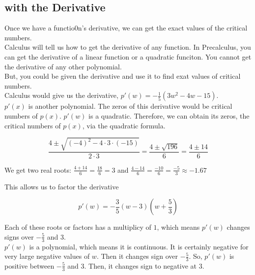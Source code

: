 \documentclass{ximera}
\begin{document}
\subsection*{with the Derivative}


Once we have a functio0n's derivative, we can get the exact values of the critical numbers. \\


Calculus will tell us how to get the derivative of any function.  In Precalculus, you can get the derivative of a linear function or a quadratic funciton.  You cannot get the derivative of any other polynomial.\\

But, you could be given the derivative and use it to find exat values of critical numbers. \\




Calculus would give us the derivative, $p'(w) = -\frac{1}{5}(3w^2 - 4w - 15)$. \\

$p'(x)$ is another polynomial. The zeros of this derivative would be critical numbers of $p(x)$.  $p'(w)$ is a quadratic.  Therefore, we can obtain its zeros, the critical numbers of $p(x)$, via the quadratic formula.


\[  \frac{4 \pm \sqrt{(-4)^2 - 4 \cdot 3 \cdot (-15)}}{2 \cdot 3} =    \frac{4 \pm \sqrt{196}}{6}  = \frac{4 \pm 14}{6}       \]

We get two real roots: $\frac{4 + 14}{6} = \frac{18}{6} = 3$  and $\frac{4 - 14}{6} = \frac{-10}{6} = \frac{-5}{3} \approx -1.67$




This allows us to factor the derivative

\[
p'(w) = -\frac{3}{5}(w - 3) \left( w + \frac{5}{3} \right)
\]

Each of these roots or factors has a multiplicy of $1$, which means $p'(w)$ changes signs over $-\frac{5}{3}$ and $3$. \\


$p'(w)$ is a polynomial, which means it is continuous. It is certainly negative for very large negative values of $w$.  Then it changes sign over $-\frac{5}{3}$.  So, $p'(w)$ is positive between $-\frac{5}{3}$ and $3$.  Then, it changes sign to negative at $3$.
\end{document}
